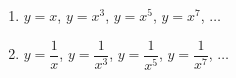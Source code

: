 \begin{frame}
\begin{columns}[onlytextwidth]
\begin{column}
      \vspace*{0.2cm}
      \begin{example-highlight}
        \begin{enumerate}
          \item $y=x$, $y=x^{3}$, $y=x^{5}$, $y=x^{7}$, $\dots$
          \item $y=\dfrac{1}{x}$, $y=\dfrac{1}{x^{3}}$, $y=\dfrac{1}{x^{5}}$, $y=\dfrac{1}{x^{7}}$, $\dots$
        \end{enumerate}
      \end{example-highlight}
    \end{column}
  \end{columns}
\end{frame}

